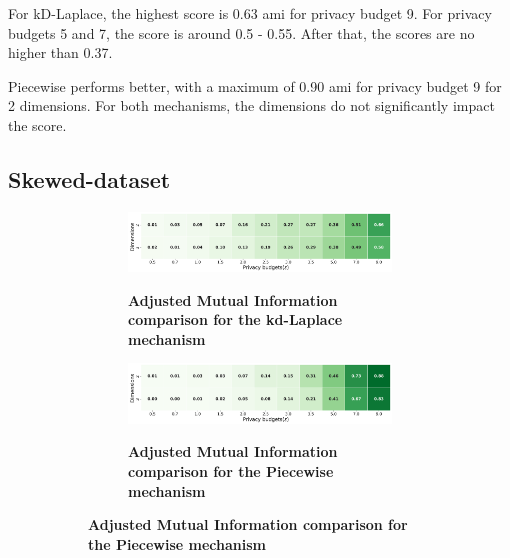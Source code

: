 For kD-Laplace, the highest score is 0.63 \gls{ami} for privacy budget 9. For privacy budgets 5 and 7, the score is around 0.5 - 0.55. After that, the scores are no higher than 0.37.

Piecewise performs better, with a maximum of 0.90 \gls{ami} for privacy budget 9 for 2 dimensions. For both mechanisms, the dimensions do not significantly impact the score.
\newpage
\subsection{Skewed-dataset}
\begin{figure}[H]
      \centering
      \begin{subfigure}[b]{0.85\textwidth}
            \begin{subfigure}[c]{1\textwidth}
                  \caption{\textbf{Adjusted Mutual Information comparison for the kd-Laplace mechanism}}
                  \includegraphics[width=1\textwidth]{Results/kd-laplace/kd-Laplace/skewed-dataset/ami.png}
                  \label{fig:ami_skewed-dataset_comparison_kdlaplace_2d}
            \end{subfigure}
            \vfill %
            \begin{subfigure}[c]{1\textwidth}
                  \caption{\textbf{Adjusted Mutual Information comparison for the Piecewise mechanism}}
                  \includegraphics[width=1\textwidth]{Results/kd-laplace/piecewise/skewed-dataset/ami.png}
                  \label{fig:ami_skewed-dataset_comparison_piecewise_2d}
            \end{subfigure}
      \end{subfigure}
      \hfill %
      \begin{subfigure}[b]{0.075\textwidth}

\end{subfigure}
\end{figure}
